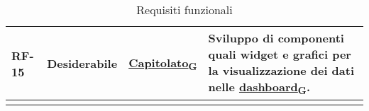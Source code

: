 \begin{longtable}{|>{\centering\arraybackslash}m{}|>{\centering\arraybackslash}m{}|>{\centering\arraybackslash}m{}|>{\centering\arraybackslash}m{}|}
	RF-15           & Desiderabile        & \href{https://7last.github.io/docs/rtb/documentazione-interna/glossario\#capitolato}{Capitolato\textsubscript{G}}     & Sviluppo di componenti quali widget e grafici per la visualizzazione dei dati nelle \href{https://7last.github.io/docs/rtb/documentazione-interna/glossario\#dashboard}{dashboard\textsubscript{G}}.                                                                                                                                                                                                                     \\\hline

	\caption{Requisiti funzionali}
	\label{table:1}
\end{longtable}

